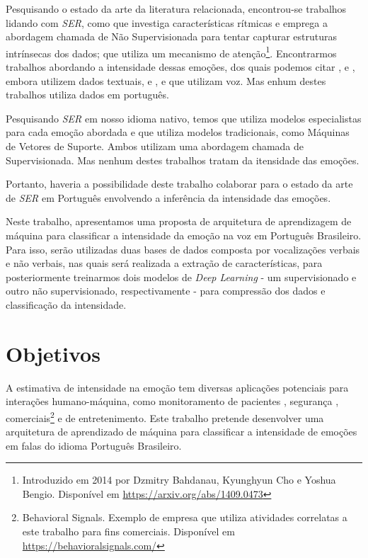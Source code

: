 Pesquisando o estado da arte da literatura relacionada, encontrou-se trabalhos lidando com \textit{SER}, como \cite{11} que investiga características rítmicas \cite{34} e emprega a abordagem chamada de Não Supervisionada para tentar capturar estruturas intrínsecas dos dados; \cite{32.95} que utiliza um mecanismo de atenção\footnote{Introduzido em 2014 por Dzmitry Bahdanau, Kyunghyun Cho e Yoshua Bengio. Disponível em \url{https://arxiv.org/abs/1409.0473}}. Encontrarmos trabalhos abordando a intensidade dessas emoções, dos quais podemos citar \cite{14}, \cite{15} e \cite{28}, embora utilizem dados textuais, e \cite{3}, \cite{18} e \cite{20} que utilizam voz. Mas enhum destes trabalhos utiliza dados em português.

Pesquisando \textit{SER} em nosso idioma nativo, temos \cite{12} que utiliza modelos especialistas para cada emoção abordada e \cite{21} que utiliza modelos tradicionais, como Máquinas de Vetores de Suporte. Ambos utilizam uma abordagem chamada de Supervisionada. Mas nenhum destes trabalhos tratam da itensidade das emoções.

Portanto, haveria a possibilidade deste trabalho colaborar para o estado da arte de \textit{SER} em Português envolvendo a inferência da intensidade das emoções.

Neste trabalho, apresentamos uma proposta de arquitetura de aprendizagem de máquina para classificar a intensidade da emoção na voz em Português Brasileiro. Para isso, serão utilizadas duas bases de dados composta por vocalizações verbais e não verbais, nas quais será realizada a extração de características, para posteriormente treinarmos dois modelos de \textit{Deep Learning} - um supervisionado e outro não supervisionado, respectivamente - para compressão dos dados e classificação da intensidade.

\section{Objetivos}

A estimativa de intensidade na emoção tem diversas aplicações potenciais para interações humano-máquina, como monitoramento de pacientes \cite{1}, segurança \cite{4}, comerciais\footnote{Behavioral Signals. Exemplo de empresa que utiliza atividades correlatas a este trabalho para fins comerciais. Disponível em \url{https://behavioralsignals.com/}} e de entretenimento. Este trabalho pretende desenvolver uma arquitetura de aprendizado de máquina para classificar a intensidade de emoções em falas do idioma Português Brasileiro.

